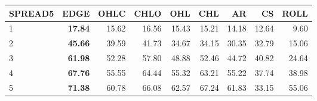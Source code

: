 \begin{table}[ht]
\centering
\begin{tabular}{lrrrrrrrr}
  \hline
SPREAD5 & EDGE & OHLC & CHLO & OHL & CHL & AR & CS & ROLL \\ 
  \hline
1 & \textbf{17.84} & 15.62 & 16.56 & 15.43 & 15.21 & 14.18 & 12.64 & 9.60 \\ 
  2 & \textbf{45.66} & 39.59 & 41.73 & 34.67 & 34.15 & 30.35 & 32.79 & 15.06 \\ 
  3 & \textbf{61.98} & 52.28 & 57.80 & 48.88 & 52.46 & 44.72 & 40.82 & 24.64 \\ 
  4 & \textbf{67.76} & 55.55 & 64.44 & 55.32 & 63.21 & 55.22 & 37.74 & 38.98 \\ 
  5 & \textbf{71.38} & 60.78 & 66.08 & 62.57 & 67.24 & 61.83 & 33.15 & 55.06 \\ 
   \hline
\end{tabular}
\end{table}
